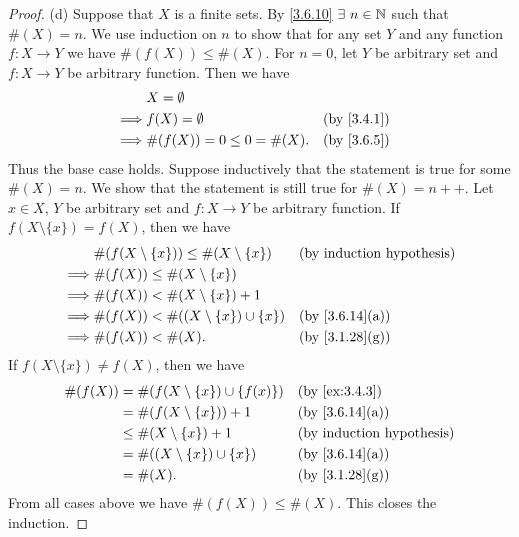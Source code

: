 \begin{proof}{(d)}
  Suppose that \(X\) is a finite sets.
  By \cref{3.6.10} \(\exists\ n \in \N\) such that \(\#(X) = n\).
  We use induction on \(n\) to show that for any set \(Y\) and any function \(f : X \to Y\) we have \(\#(f(X)) \leq \#(X)\).
  For \(n = 0\), let \(Y\) be arbitrary set and \(f : X \to Y\) be arbitrary function.
  Then we have
  \begin{align*}
             & X = \emptyset                                \\
    \implies & f(X) = \emptyset             &  & \by{3.4.1} \\
    \implies & \#(f(X)) = 0 \leq 0 = \#(X). &  & \by{3.6.5}
  \end{align*}
  Thus the base case holds.
  Suppose inductively that the statement is true for some \(\#(X) = n\).
  We show that the statement is still true for \(\#(X) = n++\).
  Let \(x \in X\), \(Y\) be arbitrary set and \(f : X \to Y\) be arbitrary function.
  If \(f(X \setminus \{x\}) = f(X)\), then we have
  \begin{align*}
             & \#(f(X \setminus \{x\})) \leq \#(X \setminus \{x\}) &  & \byIH                        \\
    \implies & \#(f(X)) \leq \#(X \setminus \{x\})                                                   \\
    \implies & \#(f(X)) < \#(X \setminus \{x\}) + 1                                                  \\
    \implies & \#(f(X)) < \#((X \setminus \{x\}) \cup \{x\})       &  & \text{(by \cref{3.6.14}(a))} \\
    \implies & \#(f(X)) < \#(X).                                   &  & \text{(by \cref{3.1.28}(g))}
  \end{align*}
  If \(f(X \setminus \{x\}) \neq f(X)\), then we have
  \begin{align*}
    \#(f(X)) & = \#(f(X \setminus \{x\}) \cup \{f(x)\}) &  & \text{(by \cref{ex:3.4.3})}  \\
             & = \#(f(X \setminus \{x\})) + 1           &  & \text{(by \cref{3.6.14}(a))} \\
             & \leq \#(X \setminus \{x\}) + 1           &  & \byIH                        \\
             & = \#((X \setminus \{x\}) \cup \{x\})     &  & \text{(by \cref{3.6.14}(a))} \\
             & = \#(X).                                 &  & \text{(by \cref{3.1.28}(g))}
  \end{align*}
  From all cases above we have \(\#(f(X)) \leq \#(X)\).
  This closes the induction.


\end{proof}
